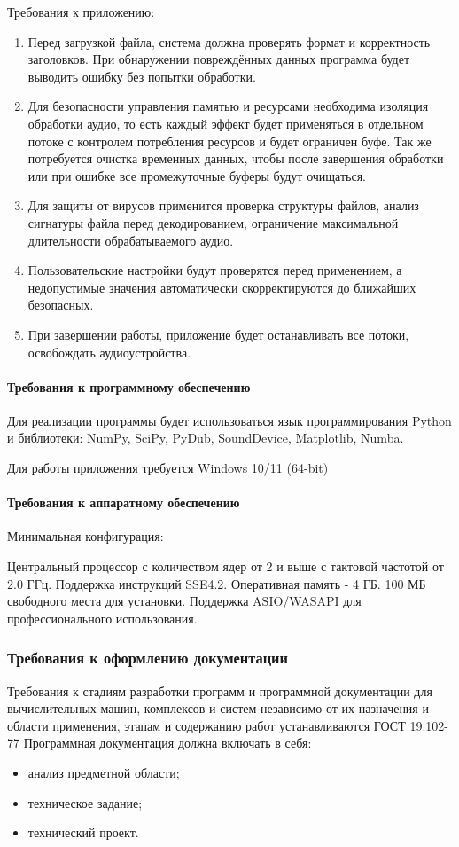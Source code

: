 Требования к приложению:
\begin{enumerate}
	\item Перед загрузкой файла, система должна проверять формат и корректность заголовков. При обнаружении повреждённых данных программа будет выводить ошибку без попытки обработки.
	\item Для безопасности управления памятью и ресурсами необходима изоляция обработки аудио, то есть каждый эффект будет применяться в отдельном потоке с контролем потребления ресурсов и будет ограничен буфе. Так же потребуется очистка временных данных, чтобы после завершения обработки или при ошибке все промежуточные буферы будут очищаться.
	\item Для защиты от вирусов применится проверка структуры файлов, анализ сигнатуры файла перед декодированием, ограничение максимальной длительности обрабатываемого аудио.
	\item Пользовательские настройки будут проверятся перед применением, а недопустимые значения автоматически скорректируются до ближайших безопасных.
	\item При завершении работы, приложение будет останавливать все потоки, освобождать аудиоустройства.
\end{enumerate}

\paragraph{Требования к программному обеспечению}

Для реализации программы будет использоваться язык программирования Python и библиотеки: NumPy, SciPy, PyDub, SoundDevice, Matplotlib, Numba.

Для работы приложения требуется Windows 10/11 (64-bit)

\paragraph{Требования к аппаратному обеспечению}

Минимальная конфигурация:

Центральный процессор с количеством ядер от 2 и выше с тактовой частотой от 2.0 ГГц. Поддержка инструкций SSE4.2. Оперативная память - 4 ГБ. 100 МБ свободного места для установки. Поддержка ASIO/WASAPI для профессионального использования.

\subsubsection{Требования к оформлению документации}

Требования к стадиям разработки программ и программной документации для вычислительных машин, комплексов и систем независимо от их назначения и области применения, этапам и содержанию работ устанавливаются ГОСТ 19.102-77
Программная документация должна включать в себя:
\begin{itemize}
	\item анализ предметной области;
	\item техническое задание;
	\item технический проект.
\end{itemize}
